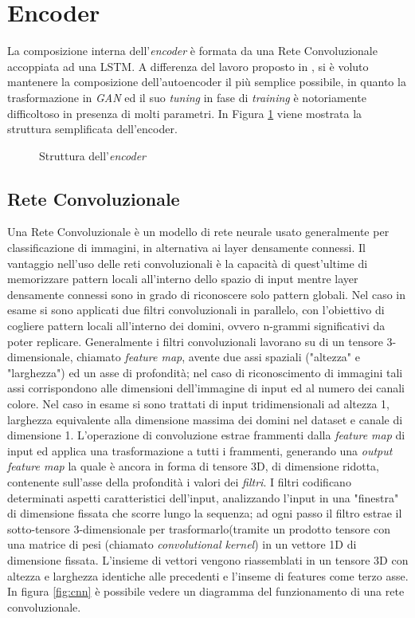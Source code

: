 \section{Encoder}
\label{encoder}
La composizione interna dell'\textit{encoder} è formata da una Rete Convoluzionale accoppiata ad una LSTM. A differenza del lavoro proposto in \cite{deepdga}, si è voluto mantenere la composizione dell'autoencoder il più semplice possibile, in quanto la trasformazione in \textit{GAN} ed il suo \textit{tuning} in fase di \textit{training} è notoriamente difficoltoso in presenza di molti parametri. In Figura \ref{fig:encoder} viene mostrata la struttura semplificata dell'encoder.

\begin{figure}[!htb]
    \centering
	
	\caption{Struttura dell'\textit{encoder}}
\label{fig:encoder}
\end{figure}

\subsection{Rete Convoluzionale}
Una Rete Convoluzionale è un modello di rete neurale usato generalmente per classificazione di immagini, in alternativa ai layer densamente connessi. Il vantaggio nell'uso delle reti convoluzionali è la capacità di quest'ultime di memorizzare pattern locali all'interno dello spazio di input mentre layer densamente connessi sono in grado di riconoscere solo pattern globali. Nel caso in esame si sono applicati due filtri convoluzionali in parallelo, con l'obiettivo di cogliere pattern locali all'interno dei domini, ovvero n-grammi significativi da poter replicare. Generalmente i filtri convoluzionali lavorano su di un tensore 3-dimensionale, chiamato \textit{feature map}, avente due assi spaziali ("altezza" e "larghezza") ed un asse di profondità; nel caso di riconoscimento di immagini tali assi corrispondono alle dimensioni dell'immagine di input ed al numero dei canali colore. Nel caso in esame si sono trattati di input tridimensionali ad altezza 1, larghezza equivalente alla dimensione massima dei domini nel dataset e canale di dimensione 1. L'operazione di convoluzione estrae frammenti dalla \textit{feature map} di input ed applica una trasformazione a tutti i frammenti, generando una \textit{output feature map} la quale è ancora in forma di tensore 3D, di dimensione ridotta, contenente sull'asse della profondità i valori dei \textit{filtri}. I filtri codificano determinati aspetti caratteristici dell'input, analizzando l'input in una "finestra" di dimensione fissata che scorre lungo la sequenza; ad ogni passo il filtro estrae il sotto-tensore 3-dimensionale per trasformarlo(tramite un prodotto tensore con una matrice di pesi (chiamato \textit{convolutional kernel}) in un vettore 1D di dimensione fissata. L'insieme di vettori vengono riassemblati in un tensore 3D con altezza e larghezza identiche alle precedenti e l'inseme di features come terzo asse. In figura \ref{fig:cnn} è possibile vedere un diagramma del funzionamento di una rete convoluzionale.

